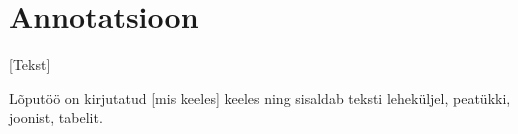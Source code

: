 \section*{\centering Annotatsioon \\ \estoniantitleofthesis}

[Tekst]

Lõputöö on kirjutatud [mis keeles] keeles ning sisaldab teksti
\pageref*{EndOfMainPart} leheküljel,  peatükki,\linebreak
{} joonist,  tabelit.

\pagebreak
